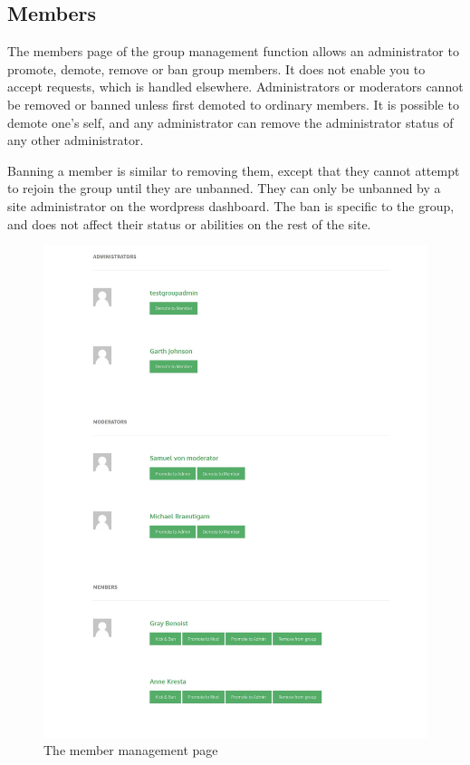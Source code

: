 \documentclass[10pt]{article}
\begin{document}
\subsection{Members}
\begin{flushleft}
The members page of the group management function allows an administrator to promote, demote, remove or ban group members.  It does not enable you to accept requests, which is handled elsewhere.  Administrators or moderators cannot be removed or banned unless first demoted to ordinary members.  It is possible to demote one's self, and any administrator can remove the administrator status of any other administrator. 
\end{flushleft}

\begin{flushleft}
Banning a member is similar to removing them, except that they cannot attempt to rejoin the group until they are unbanned.  They can only be unbanned by a site administrator on the wordpress dashboard.  The ban is specific to the group, and does not affect their status or abilities on the rest of the site.  
\end{flushleft}

\begin{figure}[H]
    \centering
    \includegraphics[scale=0.4]{images/managemembers.jpg}
    \caption{The member management page}
    \label{managemembers}
\end{figure}
\end{document}
